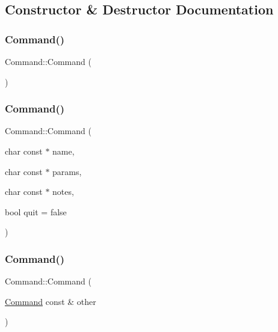 \subsection{Constructor \& Destructor Documentation}
\mbox{\label{classCommand_a18df2d81039392daeb0b78c346a70537}} 
\subsubsection{\texorpdfstring{Command()}{Command()}\hspace{0.1cm}{\footnotesize\ttfamily [1/3]}}
{\footnotesize\ttfamily Command\+::\+Command (\begin{DoxyParamCaption}{ }\end{DoxyParamCaption})}

\mbox{\label{classCommand_ac26b14828c5a72f9bd370421a4788b5d}} 
\subsubsection{\texorpdfstring{Command()}{Command()}\hspace{0.1cm}{\footnotesize\ttfamily [2/3]}}
{\footnotesize\ttfamily Command\+::\+Command (\begin{DoxyParamCaption}\item[{char const $\ast$}]{name,  }\item[{char const $\ast$}]{params,  }\item[{char const $\ast$}]{notes,  }\item[{bool}]{quit = {\ttfamily false} }\end{DoxyParamCaption})}

\mbox{\label{classCommand_a8ccab91a784c447f628ee8fec3873494}} 
\subsubsection{\texorpdfstring{Command()}{Command()}\hspace{0.1cm}{\footnotesize\ttfamily [3/3]}}
{\footnotesize\ttfamily Command\+::\+Command (\begin{DoxyParamCaption}\item[{\hyperlink{classCommand}{Command} const \&}]{other }\end{DoxyParamCaption})}

